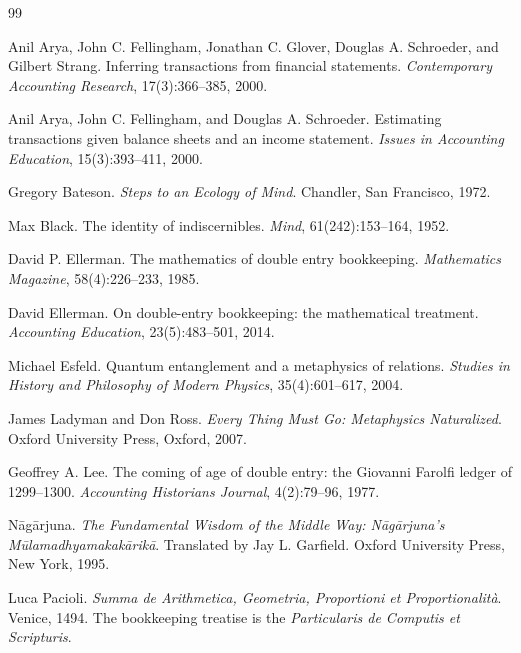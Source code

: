 \documentclass[11pt,a4paper]{article}
\begin{document}
\begin{thebibliography}{99}
\itemsep=2pt

Anil Arya, John C. Fellingham, Jonathan C. Glover, Douglas A. Schroeder, and Gilbert Strang.
\newblock Inferring transactions from financial statements.
\newblock \emph{Contemporary Accounting Research}, 17(3):366--385, 2000.

Anil Arya, John C. Fellingham, and Douglas A. Schroeder.
\newblock Estimating transactions given balance sheets and an income statement.
\newblock \emph{Issues in Accounting Education}, 15(3):393--411, 2000.

Gregory Bateson.
\newblock \emph{Steps to an Ecology of Mind}.
\newblock Chandler, San Francisco, 1972.

Max Black.
\newblock The identity of indiscernibles.
\newblock \emph{Mind}, 61(242):153--164, 1952.

David P. Ellerman.
\newblock The mathematics of double entry bookkeeping.
\newblock \emph{Mathematics Magazine}, 58(4):226--233, 1985.

David Ellerman.
\newblock On double-entry bookkeeping: the mathematical treatment.
\newblock \emph{Accounting Education}, 23(5):483--501, 2014.

Michael Esfeld.
\newblock Quantum entanglement and a metaphysics of relations.
\newblock \emph{Studies in History and Philosophy of Modern Physics}, 35(4):601--617, 2004.

James Ladyman and Don Ross.
\newblock \emph{Every Thing Must Go: Metaphysics Naturalized}.
\newblock Oxford University Press, Oxford, 2007.

Geoffrey A. Lee.
\newblock The coming of age of double entry: the Giovanni Farolfi ledger of 1299--1300.
\newblock \emph{Accounting Historians Journal}, 4(2):79--96, 1977.

N\=ag\=arjuna.
\newblock \emph{The Fundamental Wisdom of the Middle Way: N\=ag\=arjuna's M\=ulamadhyamakak\=arik\=a}.
\newblock Translated by Jay L. Garfield. Oxford University Press, New York, 1995.

Luca Pacioli.
\newblock \emph{Summa de Arithmetica, Geometria, Proportioni et Proportionalit\`a}.
\newblock Venice, 1494.
\newblock The bookkeeping treatise is the \emph{Particularis de Computis et Scripturis}.


\end{thebibliography}
\end{document}
